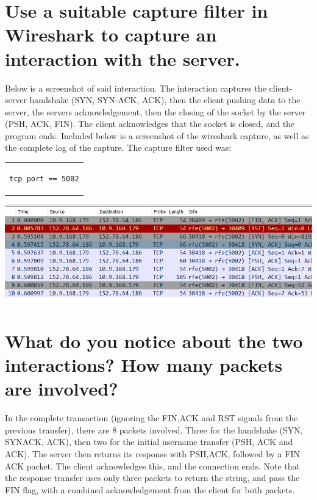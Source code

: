 \section{Use a suitable capture filter in Wireshark to capture an interaction with the server.}
\begin{normalsize}
Below is a screenshot of said interaction. The interaction captures the client-server handshake (SYN, SYN-ACK, ACK), then the client pushing data to the server, the servers acknowledgement, then the closing of the socket by the server (PSH, ACK, FIN). The client acknowledges that the socket is closed, and the program ends. Included below is a screenshot of the wireshark capture, as well as the complete log of the capture. The capture filter used was:
\end{normalsize}
\begin{center}
\begin{tabular}{c}
\begin{lstlisting}
tcp port == 5002
\end{lstlisting}
\end{tabular}
\end{center}
\includegraphics[scale=0.9]{wireshark_capture}

\section{What do you notice about the two interactions? How many packets are involved?}
\begin{normalsize}
In the complete transaction (ignoring the FIN,ACK and RST signals from the previous transfer), there are 8 packets involved. Three for the handshake (SYN, SYNACK, ACK), then two for the initial username transfer (PSH, ACK and ACK). The server then returns its response with PSH,ACK, followed by a FIN ACK packet. The client acknowledges this, and the connection ends. Note that the response transfer uses only three packets to return the string, and pass the FIN flag, with a combined acknowledgement from the client for both packets. 
\end{normalsize}





